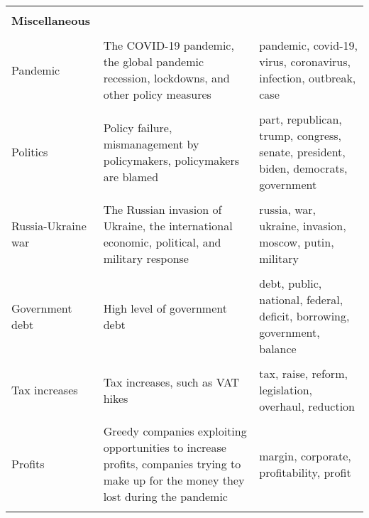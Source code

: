 \begin{table}
\begin{scriptsize}
\begin{tabular}[htp]{p{3.5cm}|p{5cm}|p{5cm}}
			&                                                                                                                                                                                                 &                                                                                                                                             \\
			\textbf{Miscellaneous}   &                                                                                                                                                                                                 &                                                                                                                                             \\ \hline \\[0.02cm]
			Pandemic                 & The COVID-19 pandemic, the   global pandemic recession, lockdowns, and other policy measures                                                    & pandemic, covid-19, virus, coronavirus, infection, outbreak, case                           \\ \\[0.07cm]
			Politics & Policy failure, mismanagement by   policymakers, policymakers are blamed                                                            & part, republican, trump, congress, senate, president, biden, democrats, government\\ \\[0.02cm]
			Russia-Ukraine war       & The Russian invasion of Ukraine,   the international economic, political, and military response                                               & russia, war, ukraine, invasion, moscow, putin, military                           \\ \\[0.02cm]
			Government debt          & High level of government   debt                                                                                                                                                                & debt, public, national, federal, deficit, borrowing, government, balance                                                                   \\ \\[0.02cm]
			Tax increases            & Tax increases, such as VAT   hikes                                                                                                                                                             & tax, raise, reform, legislation, overhaul, reduction\\ \\[0.02cm]
			Profits            & Greedy companies exploiting opportunities to increase profits, companies trying to make up for the money they lost during the pandemic & margin, corporate, profitability, profit\\ \\[0.02cm] \bottomrule                                                                  
		\end{tabular}
	\end{scriptsize}
\end{table}
